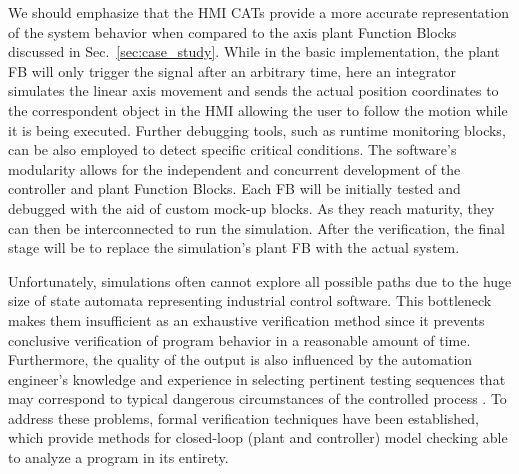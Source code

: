 \begin{bibunit}
We should emphasize that the HMI CATs provide a more accurate representation of the system behavior when compared to the axis plant Function Blocks discussed in \mbox{Sec. \ref{sec:case_study}}. While in the basic implementation, the plant FB will only trigger the  signal after an arbitrary time, here an integrator simulates the linear axis movement and sends the actual position coordinates to the correspondent object in the HMI allowing the user to follow the motion while it is being executed. Further debugging tools, such as runtime monitoring blocks, can be also employed to detect specific critical conditions.
The software's modularity allows for the independent and concurrent development of the controller and plant Function Blocks. Each FB will be initially tested and debugged with the aid of custom mock-up blocks. As they reach maturity, they can then be interconnected to run the simulation. After the verification, the final stage will be to replace the simulation's plant FB with the actual system. 

Unfortunately, simulations often cannot explore all possible paths due to the huge size of state automata representing industrial control software. This bottleneck makes them insufficient as an exhaustive verification method since it prevents conclusive verification of program behavior in a reasonable amount of time. Furthermore, the quality of the output is also influenced by the automation engineer's knowledge and experience in selecting pertinent testing sequences that may correspond to typical dangerous circumstances of the controlled process \cite{Schnakenbourg2002}. 
To address these problems, formal verification techniques have been established, which provide methods for closed-loop (plant and controller) model checking able to analyze a program in its entirety.


\end{bibunit}
